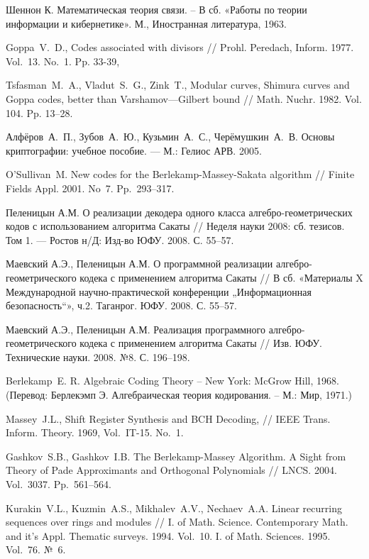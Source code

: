\documentclass[14pt]{extarticle}
\begin{document}
\begin{thebibliography}{99}

Шеннон К. Математическая теория связи. – В сб. «Работы по
теории информации и кибернетике». М., Иностранная литература, 1963.

Goppa~V.~D., Codes associated with divisors // Prohl. Peredach,
Inform. 1977. Vol.~13. No.~1. Pp. 33-39,

Tsfasman~M.~A., Vladut~S.~G., Zink~T., Modular curves,
Shimura curves and Goppa codes, better than Varshamov—Gilbert
bound // Math. Nuchr. 1982. Vol. 104. Pp. 13–28.

Алфёров~А.~П., Зубов~А.~Ю., Кузьмин~А.~С., Черёмушкин~А.~В. 
Основы криптографии: учебное пособие. — М.: Гелиос АРВ. 2005.

O’Sullivan~M. New codes for the Berlekamp-Massey-Sakata
algorithm // Finite Fields Appl. 2001. No~7. Pp.~293–317.

Пеленицын А.М. О реализации декодера одного класса
алгебро-геометрических кодов с использованием алгоритма Сакаты // Неделя науки
2008: сб. тезисов. Том 1. — Ростов н/Д: Изд-во ЮФУ. 2008. С. 55–57.

Маевский А.Э., Пеленицын А.М. О программной реализации
алгебро-геометрического кодека с применением алгоритма Сакаты // В сб.
«Материалы X Международной научно-практической конференции „Информационная
безопасность“», ч.2. Таганрог. ЮФУ. 2008. С. 55–57.

Маевский А.Э., Пеленицын А.М. Реализация программного
алгебро-геометрического кодека с применением алгоритма Сакаты // Изв. ЮФУ.
Технические науки. 2008. №8. С. 196–198.

Berlekamp~E. R. Algebraic Coding Theory
– New York: McGrow Hill, 1968. (Перевод: Берлекэмп Э. Алгебраическая
теория кодирования. – М.: Мир, 1971.)

Massey~J.L., Shift Register Synthesis and BCH Decoding,
// IEEE Trans. Inform. Theory. 1969, Vol.~IT-15. No.~1.

Gashkov~S.B., Gashkov~I.B. The Berlekamp-Massey Algorithm. A 
Sight from Theory of Pade Approximants and Orthogonal Polynomials // LNCS. 2004.
Vol.~3037. Pp.~561–564.

Kurakin~V.L., Kuzmin~A.S., Mikhalev~A.V., Nechaev~A.A.
Linear recurring sequences over rings and modules // I. of Math. Science.
Contemporary Math. and it's Appl. Thematic surveys. 1994. Vol.~10. I. of Math.
Sciences. 1995. Vol.~76. №~6.


\end{thebibliography}
\end{document}
